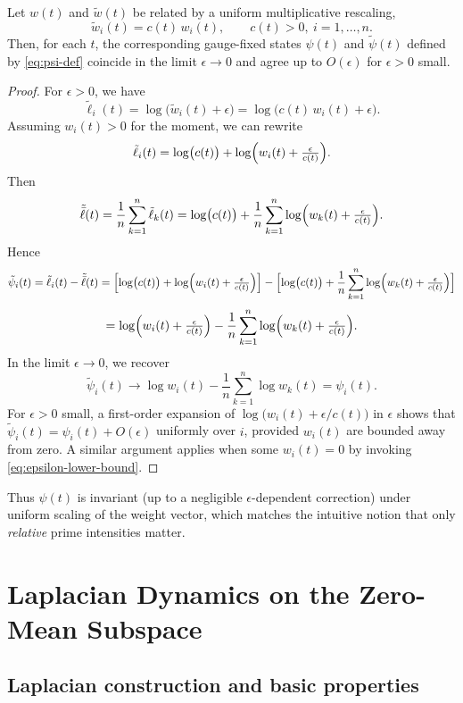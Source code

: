 \documentclass[11pt]{article}
\begin{document}
\begin{lemma}
\label{lem:gauge-invariance}
Let \(w(t)\) and \(\tilde{w}(t)\) be related by a uniform multiplicative rescaling,
\[
\tilde{w}_i(t) = c(t)\,w_i(t),\qquad c(t) > 0,\ i=1,\dots,n.
\]
Then, for each \(t\), the corresponding gauge-fixed states \(\psi(t)\) and
\(\tilde{\psi}(t)\) defined by \eqref{eq:psi-def} coincide in the limit
\(\epsilon\to 0\) and agree up to \(O(\epsilon)\) for \(\epsilon>0\) small.
\end{lemma}

\begin{proof}
For \(\epsilon>0\), we have
\[
\tilde{\ell}_i(t)
  = \log\bigl(\tilde{w}_i(t)+\epsilon\bigr)
  = \log\bigl(c(t)\,w_i(t) + \epsilon\bigr).
\]
Assuming \(w_i(t)>0\) for the moment, we can rewrite
\[
\tilde{\ell}_i(t)
  = \log\bigl(c(t)\bigr) + \log\Bigl(w_i(t) + \tfrac{\epsilon}{c(t)}\Bigr).
\]
Then
\[
\tilde{\bar{\ell}}(t)
  = \frac{1}{n}\sum_{k=1}^n \tilde{\ell}_k(t)
  = \log\bigl(c(t)\bigr) + \frac{1}{n}\sum_{k=1}^n
    \log\Bigl(w_k(t) + \tfrac{\epsilon}{c(t)}\Bigr).
\]
Hence
\[
\tilde{\psi}_i(t)
  = \tilde{\ell}_i(t) - \tilde{\bar{\ell}}(t)
  = \Bigl[\log\bigl(c(t)\bigr) + \log\Bigl(w_i(t) + \tfrac{\epsilon}{c(t)}\Bigr)\Bigr]
    - \Bigl[\log\bigl(c(t)\bigr) + \frac{1}{n}\sum_{k=1}^n
     \log\Bigl(w_k(t) + \tfrac{\epsilon}{c(t)}\Bigr)\Bigr]
\]
\[
= \log\Bigl(w_i(t) + \tfrac{\epsilon}{c(t)}\Bigr)
  - \frac{1}{n}\sum_{k=1}^n
    \log\Bigl(w_k(t) + \tfrac{\epsilon}{c(t)}\Bigr).
\]
In the limit \(\epsilon\to 0\), we recover
\[
\tilde{\psi}_i(t) \to \log w_i(t) - \frac{1}{n}\sum_{k=1}^n \log w_k(t) = \psi_i(t).
\]
For \(\epsilon>0\) small, a first-order expansion of
\(\log\bigl(w_i(t)+\epsilon/c(t)\bigr)\) in \(\epsilon\) shows that
\(\tilde{\psi}_i(t) = \psi_i(t) + O(\epsilon)\) uniformly over \(i\), provided
\(w_i(t)\) are bounded away from zero. A similar argument applies when some
\(w_i(t)=0\) by invoking \eqref{eq:epsilon-lower-bound}.
\end{proof}

Thus \(\psi(t)\) is invariant (up to a negligible \(\epsilon\)-dependent
correction) under uniform scaling of the weight vector, which matches the
intuitive notion that only \emph{relative} prime intensities matter.

\section{Laplacian Dynamics on the Zero-Mean Subspace}

\subsection{Laplacian construction and basic properties}
\end{document}
